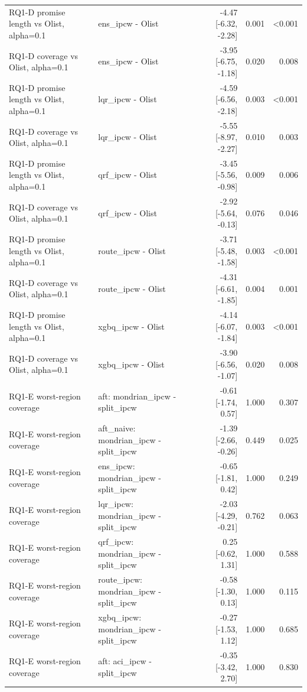 \begin{table}[!htbp]
\begin{tabular}{llrrr}
RQ1-D promise length vs Olist, alpha=0.1 & ens\_ipcw - Olist & -4.47 [-6.32, -2.28] & 0.001 & <0.001 \\
RQ1-D coverage vs Olist, alpha=0.1 & ens\_ipcw - Olist & -3.95 [-6.75, -1.18] & 0.020 & 0.008 \\
RQ1-D promise length vs Olist, alpha=0.1 & lqr\_ipcw - Olist & -4.59 [-6.56, -2.18] & 0.003 & <0.001 \\
RQ1-D coverage vs Olist, alpha=0.1 & lqr\_ipcw - Olist & -5.55 [-8.97, -2.27] & 0.010 & 0.003 \\
RQ1-D promise length vs Olist, alpha=0.1 & qrf\_ipcw - Olist & -3.45 [-5.56, -0.98] & 0.009 & 0.006 \\
RQ1-D coverage vs Olist, alpha=0.1 & qrf\_ipcw - Olist & -2.92 [-5.64, -0.13] & 0.076 & 0.046 \\
RQ1-D promise length vs Olist, alpha=0.1 & route\_ipcw - Olist & -3.71 [-5.48, -1.58] & 0.003 & <0.001 \\
RQ1-D coverage vs Olist, alpha=0.1 & route\_ipcw - Olist & -4.31 [-6.61, -1.85] & 0.004 & 0.001 \\
RQ1-D promise length vs Olist, alpha=0.1 & xgbq\_ipcw - Olist & -4.14 [-6.07, -1.84] & 0.003 & <0.001 \\
RQ1-D coverage vs Olist, alpha=0.1 & xgbq\_ipcw - Olist & -3.90 [-6.56, -1.07] & 0.020 & 0.008 \\
RQ1-E worst-region coverage & aft: mondrian\_ipcw - split\_ipcw & -0.61 [-1.74, 0.57] & 1.000 & 0.307 \\
RQ1-E worst-region coverage & aft\_naive: mondrian\_ipcw - split\_ipcw & -1.39 [-2.66, -0.26] & 0.449 & 0.025 \\
RQ1-E worst-region coverage & ens\_ipcw: mondrian\_ipcw - split\_ipcw & -0.65 [-1.81, 0.42] & 1.000 & 0.249 \\
RQ1-E worst-region coverage & lqr\_ipcw: mondrian\_ipcw - split\_ipcw & -2.03 [-4.29, -0.21] & 0.762 & 0.063 \\
RQ1-E worst-region coverage & qrf\_ipcw: mondrian\_ipcw - split\_ipcw & 0.25 [-0.62, 1.31] & 1.000 & 0.588 \\
RQ1-E worst-region coverage & route\_ipcw: mondrian\_ipcw - split\_ipcw & -0.58 [-1.30, 0.13] & 1.000 & 0.115 \\
RQ1-E worst-region coverage & xgbq\_ipcw: mondrian\_ipcw - split\_ipcw & -0.27 [-1.53, 1.12] & 1.000 & 0.685 \\
RQ1-E worst-region coverage & aft: aci\_ipcw - split\_ipcw & -0.35 [-3.42, 2.70] & 1.000 & 0.830 \\

\end{tabular}
\end{table}
